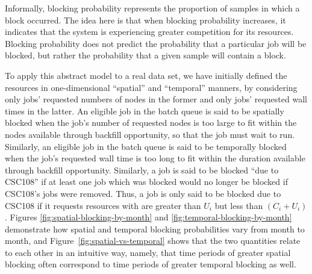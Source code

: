 Informally, blocking probability represents the proportion of samples 
 in which a
block occurred. The idea here is that when blocking probability increases, it
indicates that the system is experiencing greater competition for its
resources. Blocking probability does not predict the probability that a
particular job will be blocked, but rather the probability that a given sample
will contain a block.

To apply this abstract model to a real data set, we have initially defined the
resources in one-dimensional ``spatial'' and ``temporal'' manners, by
considering only jobs' requested numbers of nodes in the former and only jobs'
requested wall times in the latter. An eligible job in the batch queue is said
to be spatially blocked when the job’s number of requested nodes is too large
to fit within the nodes available through backfill opportunity, so that the job
must wait to run. Similarly, an eligible job in the batch queue is said to be
temporally blocked when the job’s requested wall time is too long to fit within
the duration available through backfill opportunity. Similarly, a job is said
to be blocked ``due to CSC108'' if at least one job which was blocked would no
longer be blocked if CSC108's jobs were removed. Thus, a job is only said to be
blocked due to CSC108 if it requests resources with are greater than $U_i$ but
less than $(C_i + U_i)$. Figures
\ref{fig:spatial-blocking-by-month} and \ref{fig:temporal-blocking-by-month}
demonstrate how spatial and temporal blocking probabilities vary from month to
month, and Figure~\ref{fig:spatial-vs-temporal} shows that the two quantities
relate to each other in an intuitive way, namely, that time periods of greater
spatial blocking often correspond to time periods of greater temporal blocking
as well.

